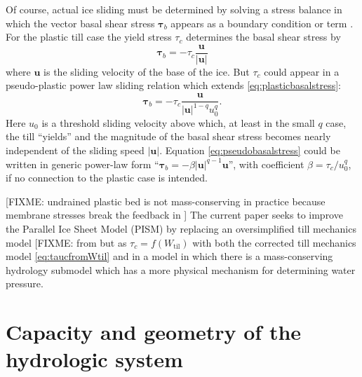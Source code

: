 \documentclass[11pt,final]{amsart}
\newcommand{\Wtil}{W_{\text{til}}}
\begin{document}
Of course, actual ice sliding must be determined by solving a stress balance in which the vector basal shear stress $\mathbold{\tau}_b$ appears as a boundary condition or term \citep[for example]{SchoofHewitt2013}.  For the plastic till case the yield stress $\tau_c$ determines the basal shear stress by
\begin{equation}
\mathbold{\tau}_b = - \tau_c \frac{\mathbold{u}}{|\mathbold{u}|} \label{eq:plasticbasalstress}
\end{equation}
where $\mathbold{u}$ is the sliding velocity of the base of the ice.  But $\tau_c$ could appear in a pseudo-plastic power law sliding relation \citep[see supplement]{AschwandenAdalgeirsdottirKhroulev} which extends \eqref{eq:plasticbasalstress}:
\begin{equation}
\mathbold{\tau}_b = - \tau_c \frac{\mathbold{u}}{|\mathbold{u}|^{1-q} u_0^q}. \label{eq:pseudobasalstress}
\end{equation}
Here $u_0$ is a threshold sliding velocity above which, at least in the small $q$ case, the till ``yields'' and the magnitude of the basal shear stress becomes nearly independent of the sliding speed $|\mathbold{u}|$.  Equation \eqref{eq:pseudobasalstress} could be written in generic power-law form ``$\mathbold{\tau}_b = - \beta |\mathbold{u}|^{q-1} \mathbold{u}$'', with coefficient $\beta = \tau_c / u_0^q$, if no connection to the plastic case is intended.

[FIXME: undrained plastic bed is not mass-conserving in practice because membrane stresses break the feedback in \cite{Tulaczyketal2000b}]  The current paper seeks to improve the Parallel Ice Sheet Model (PISM) by replacing an oversimplified till mechanics model [FIXME: from \cite{BBssasliding} but as $\tau_c = f(\Wtil)$ with both the corrected till mechanics model \eqref{eq:taucfromWtil} and in a model in which there is a mass-conserving hydrology submodel which has a more physical mechanism for determining water pressure.


\section{Capacity and geometry of the hydrologic system} \label{sec:capacity}
\end{document}
